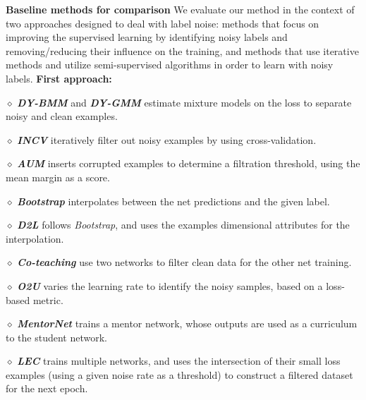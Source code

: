 \documentclass{article}
\newcommand{\myparagraph}[1]{\smallskip\noindent\textbf{#1}}
\begin{document}
\myparagraph{Baseline methods for comparison} We evaluate our method in the context of two approaches designed to deal with label noise: methods that focus on improving the supervised learning by identifying noisy labels and removing/reducing their influence on the training, and methods that use iterative methods and utilize semi-supervised algorithms in order to learn with noisy labels.
\myparagraph{First approach:} 
\begin{inparadesc} \item[$\diamond$] \textbf{\emph{DY-BMM}} and \textbf{\emph{DY-GMM}} \citep{arazo2019unsupervised} estimate mixture models on the loss to separate noisy and clean examples. 
    \item[$\diamond$]  \textbf{\emph{INCV}} \citep{chen2019understanding} iteratively filter out noisy examples by using cross-validation.
    \item[$\diamond$]  \textbf{\emph{AUM}} \citep{pleiss2020identifying} inserts corrupted examples to determine a filtration threshold, using the mean margin  as a score.
    \item[$\diamond$] \textbf {\emph{Bootstrap}} \citep{reed2014training} interpolates between the net predictions and the given label.
    \item[$\diamond$]  \textbf{\emph{D2L}} \citep{ma2018dimensionality} follows \emph{Bootstrap}, and uses the examples dimensional attributes for the interpolation.
    \item[$\diamond$]  \textbf{\emph{Co-teaching}} \citep{han2018co} use two networks to filter clean data for the other net training.
    \item[$\diamond$]  \textbf{\emph{O2U}} \citep{o2u} varies the learning rate to identify the noisy samples, based on a loss-based metric.
    \item[$\diamond$]  \textbf{\emph{MentorNet}} \citep{jiang2018mentornet} trains a mentor network, whose outputs are used as a curriculum to the student network. \item[$\diamond$]  \textbf{\emph{LEC}} \citep{lec} trains multiple networks, and uses the intersection of their small loss examples (using a given noise rate as a threshold) to construct a filtered dataset for the next epoch.
    \end{inparadesc}
\end{document}
